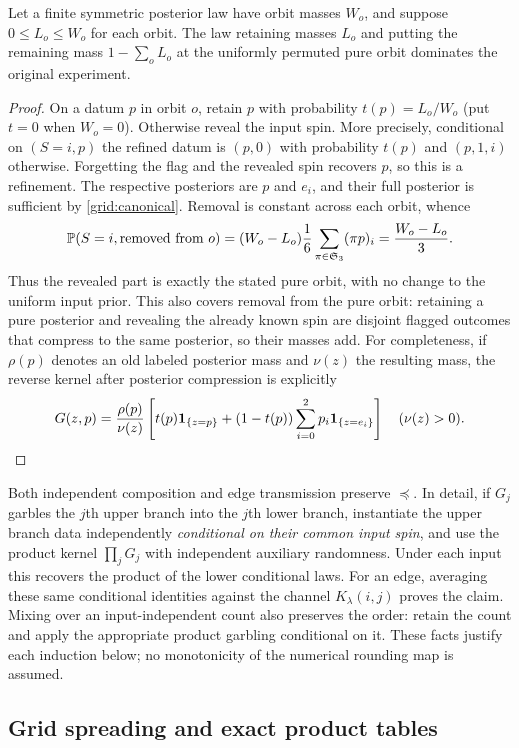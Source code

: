 \begin{lemma}
\label{grid:completion}
Let a finite symmetric posterior law have orbit masses $W_o$, and suppose
$0\leq L_o\leq W_o$ for each orbit.  The law retaining masses $L_o$ and
putting the remaining mass $1-\sum_oL_o$ at the uniformly permuted pure
orbit dominates the original experiment.
\end{lemma}
\begin{proof}
On a datum $p$ in orbit $o$, retain $p$ with probability
$t(p)=L_o/W_o$ (put $t=0$ when $W_o=0$).  Otherwise reveal the input spin.
More precisely, conditional on $(S=i,p)$ the refined datum is $(p,0)$
with probability $t(p)$ and $(p,1,i)$ otherwise.  Forgetting the flag and
the revealed spin recovers $p$, so this is a refinement.  The respective
posteriors are $p$ and $e_i$, and their full posterior is sufficient by
\eqref{grid:canonical}.  Removal is constant across each orbit, whence
\[
 \mathbb P(S=i,\text{removed from }o)
   =(W_o-L_o)\frac16\sum_{\pi\in\mathfrak S_3}(\pi p)_i
   =\frac{W_o-L_o}{3}.
\]
Thus the revealed part is exactly the stated pure orbit, with no change
to the uniform input prior. This also covers removal from the pure orbit:
retaining a pure posterior and revealing the already known spin are
disjoint flagged outcomes that compress to the same posterior, so their
masses add.
For completeness, if $\rho(p)$ denotes an old labeled posterior mass and
$\nu(z)$ the resulting mass, the reverse kernel after posterior
compression is explicitly
\[
 G(z,p)=\frac{\rho(p)}{\nu(z)}
 \left[t(p)\mathbf1_{\{z=p\}}+
 (1-t(p))\sum_{i=0}^2p_i\mathbf1_{\{z=e_i\}}\right]
 \quad(\nu(z)>0).\qedhere
\]
\end{proof}

Both independent composition and edge transmission preserve
$\preceq$.  In detail, if $G_j$ garbles the $j$th upper branch into the
$j$th lower branch, instantiate the upper branch data independently
\emph{conditional on their common input spin}, and use the product
kernel $\prod_jG_j$ with independent auxiliary randomness.  Under each
input this recovers the product of the lower conditional laws.  For an
edge, averaging these same conditional identities against the channel
$K_\lambda(i,j)$ proves the claim.  Mixing over an input-independent
count also preserves the order: retain the count and apply the appropriate
product garbling conditional on it.  These facts justify each induction
below; no monotonicity of the numerical rounding map is assumed.

\subsection{Grid spreading and exact product tables}

